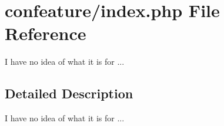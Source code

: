 \hypertarget{index_8php}{\section{confeature/index.php File Reference}
\label{index_8php}
}


I have no idea of what it is for ...  




\subsection{Detailed Description}
I have no idea of what it is for ... 